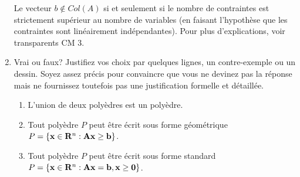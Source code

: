 \begin{enumerate}
    \begin{solution}
      Le vecteur $b \notin Col(A) $ si et seulement si le nombre de contraintes est strictement supérieur au nombre de variables (en faisant l'hypothèse que les contraintes sont linéairement indépendantes). Pour plus d'explications, voir transparents CM 3.
    \end{solution}

  \item Vrai ou faux? Justifiez vos choix par quelques lignes, un contre-exemple ou un dessin. Soyez assez précis pour convaincre
    que vous ne devinez pas la réponse mais ne fournissez toutefois pas une justification formelle et détaillée.

    \begin{enumerate}


      \item L'union de deux polyèdres est un polyèdre.



      \item Tout polyèdre $P$ peut être écrit sous forme géométrique $P=\{ {\bf x} \in {\bf R}^n: \bf A \bf x\geq \bf b\}$.

      \item Tout polyèdre $P$ peut être écrit sous forme standard
        $P=\{ {\bf x} \in {\bf R}^n: \bf A \bf x= \bf b, \bf x \geq 0\}$.








\end{enumerate}
\end{enumerate}
